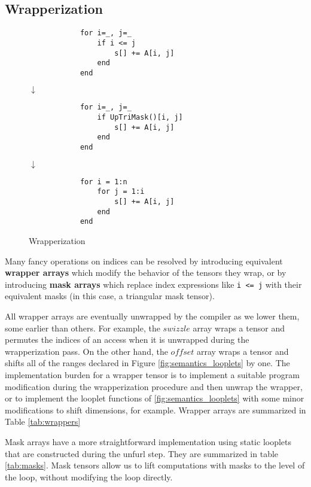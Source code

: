 \subsection{Wrapperization}
    \begin{wrapfigure}{R}{0.2\textwidth}
        \vspace{-1\intextsep}
        \begin{verbatim}
            for i=_, j=_
                if i <= j
                    s[] += A[i, j]
                end
            end
        \end{verbatim}
        $\downarrow$
        \begin{verbatim}
            for i=_, j=_
                if UpTriMask()[i, j]
                    s[] += A[i, j]
                end
            end
        \end{verbatim}
        $\downarrow$
        \begin{verbatim}
            for i = 1:n
                for j = 1:i
                    s[] += A[i, j]
                end
            end
        \end{verbatim}
        \caption{Wrapperization}\label{fig:wrapperization}
    \end{wrapfigure}

    Many fancy operations on indices can be resolved by introducing equivalent
    \textbf{wrapper arrays} which modify the behavior of the tensors they wrap,
    or by introducing \textbf{mask arrays} which replace index expressions like
    \texttt{i <= j} with their equivalent masks (in this case, a
    triangular mask tensor).

    All wrapper arrays are eventually unwrapped by the compiler as we lower
    them, some earlier than others. For example, the $swizzle$ array wraps a
    tensor and permutes the indices of an access when it is unwrapped during the
    wrapperization pass. On the other hand, the $offset$ array wraps a tensor
    and shifts all of the ranges declared in Figure \ref{fig:semantics_looplets} by one.
    The implementation burden for a wrapper tensor is to implement a suitable
    program modification during the wrapperization procedure and then unwrap the wrapper, or to 
    implement the looplet functions of \ref{fig:semantics_looplets} with some minor modifications
    to shift dimensions, for example. Wrapper arrays are summarized in Table \ref{tab:wrappers}

    Mask arrays have a more straightforward implementation using static looplets
    that are constructed during the unfurl step. They are summarized in table \ref{tab:masks}. Mask tensors
    allow us to lift computations with masks to the level of the loop, without modifying the loop directly.


